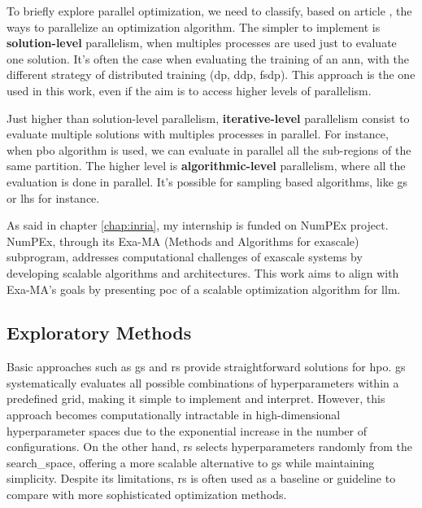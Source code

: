 To briefly explore parallel optimization, we need to classify, based on article \cite{kacprzyk_parallel_2015}, the ways to parallelize an optimization algorithm. The simpler to implement is \textbf{solution-level} parallelism, when multiples processes are used just to evaluate one solution. It's often the case when evaluating the training of an \acrshort{ann}, with the different strategy of distributed training (\acrfull{dp}, \acrfull{ddp}, \acrfull{fsdp}). This approach is the one used in this work, even if the aim is to access higher levels of parallelism.

Just higher than solution-level parallelism, \textbf{iterative-level} parallelism consist to evaluate multiple solutions with multiples processes in parallel. For instance, when \acrshort{pbo} algorithm is used, we can evaluate in parallel all the sub-regions of the same partition. The higher level is \textbf{algorithmic-level} parallelism, where all the evaluation is done in parallel. It's possible for sampling based algorithms, like \acrshort{gs} or \acrshort{lhs} for instance.

As said in chapter \ref{chap:inria}, my internship is funded on NumPEx project. NumPEx, through its Exa-MA (Methods and Algorithms for \Gls{exascale}) subprogram, addresses computational challenges of \gls{exascale} systems by developing scalable algorithms and architectures. This work aims to align with Exa-MA's goals by presenting \acrlong{poc} of a scalable optimization algorithm for \acrshort{llm}.

\subsection{Exploratory Methods} 
\label{sec:expl}
Basic approaches such as \acrfull{gs} and \acrfull{rs} provide straightforward solutions for \acrshort{hpo}. \acrshort{gs} systematically evaluates all possible combinations of \glspl{hyperparameter} within a predefined grid, making it simple to implement and interpret. However, this approach becomes computationally intractable in high-dimensional \gls{hyperparameter} spaces due to the exponential increase in the number of configurations. On the other hand, \acrshort{rs} selects \glspl{hyperparameter} randomly from the \gls{search_space}, offering a more scalable alternative to \acrshort{gs} while maintaining simplicity. Despite its limitations, \acrshort{rs} is often used as a baseline or guideline to compare with more sophisticated optimization methods.


